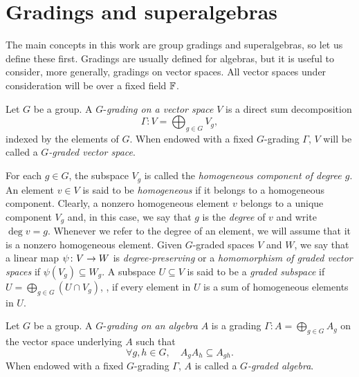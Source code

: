 \section{Gradings and superalgebras}\label{sec:grds-and-sa}

The main concepts in this work are group gradings and superalgebras, so let us define these first.
Gradings are usually defined for algebras, but it is useful to consider, more generally, gradings on vector spaces. 
All vector spaces under consideration will be over a fixed field $\mathbb{F}$. 

\begin{defi}\label{defi:grading}
    Let $G$ be a group. 
	A $G$-\emph{grading on a vector space} $V$ is a direct sum decomposition
	\[\label{eq:grading}
	    \Gamma : V= \bigoplus_{g \in G} V_g,
	\]
	indexed by the elements of $G$.
	When endowed with a fixed $G$-grading $\Gamma$, $V$ will be called a \emph{$G$-graded vector space}. 
\end{defi}

For each $g\in G$, the subspace $V_g$ is called the \emph{homogeneous component of degree $g$}. 
An element $v \in V$ is said to be \emph{homogeneous} if it belongs to a homogeneous component. 
Clearly, a nonzero homogeneous element $v$ belongs to a unique component $V_g$ and, in this case, we say that $g$ is the \emph{degree} of $v$ and write $\deg v = g$. 
Whenever we refer to the degree of an element, we will assume that it is a nonzero homogeneous element. 
\label{homogeneousMap} Given $G$-graded spaces $V$ and $W$, we say that a linear map $\psi\colon V \to W$ is \emph{degree-preserving} or a \emph{homomorphism of graded vector spaces}
if $\psi(V_g) \subseteq W_g$. 
A subspace $U\subseteq V$ is said to be a \emph{graded subspace} if $U = \bigoplus_{g\in G} (U\cap V_g)$, \ie, if every element in $U$ is a sum of homogeneous elements in $U$. 

\begin{defi}\label{def:grading}
	Let $G$ be a group. 
	A $G$-\emph{grading on an algebra} $A$ is 
    a grading 
	$
	    \Gamma : A= \bigoplus_{g \in G} A_g
	$ on the vector space underlying $A$
	such that 
	\[
	    \forall g, h\in G, \quad
	    A_g A_h \subseteq A_{gh}.
	\]
	When endowed with a fixed $G$-grading $\Gamma$, $A$ is called a \emph{$G$-graded algebra}. 
\end{defi}

